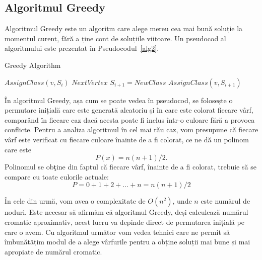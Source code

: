 \documentclass[runningheads]{llncs}
\begin{document}
\subsection{Algoritmul Greedy}
Algoritmul Greedy este un algoritm care alege mereu cea mai bună soluție la
momentul curent, fără a ține cont de soluțiile viitoare.
Un pseudocod al algoritmului este prezentat în
Pseudocodul~\ref{alg2}.


\begin{algorithm} 
\caption{Greedy Algorithm}
\label{alg2}
\begin{algorithmic}[1]
\State $AssignClass(v, S_i)$
\State $Next Vertex$
\EndIf
\EndFor
{}
\State $S_{i+1} = NewClass$
\State $AssignClass(v, S_{i+1})$
\EndIf
\EndFor
\EndProcedure
\end{algorithmic}
\end{algorithm}

În algoritmul Greedy, așa cum se poate vedea în pseudocod,
se folosește o permutare inițială care este generată aleatoriu și în
care este colorat fiecare vârf, comparând în fiecare caz dacă acesta
poate fi inclus într-o culoare fără a provoca conflicte. Pentru a analiza
algoritmul în cel mai rău caz, vom presupune că fiecare vârf este 
verificat cu fiecare culoare înainte de a fi colorat,
ce ne dă un polinom care este
\begin{equation} P(x) = n(n+1)/2. \end{equation} Polinomul
se obţine din faptul că fiecare vârf, înainte de a fi colorat,
trebuie să se compare cu toate culorile actuale:
\begin{equation} P = 0 + 1 + 2 + . . . + n = n(n + 1)/2 \end{equation}

În cele din urmă, vom avea o complexitate de $O(n^2)$, unde $n$ este numărul
de noduri. Este necesar să afirmăm că algoritmul Greedy, deși calculează
numărul cromatic aproximativ, acest lucru va depinde direct de permutarea
inițială pe care o avem. Cu algoritmul următor vom vedea tehnici care ne
permit să îmbunătățim modul de a alege vârfurile pentru a obține soluții
mai bune și mai apropiate de numărul cromatic.
\end{document}
